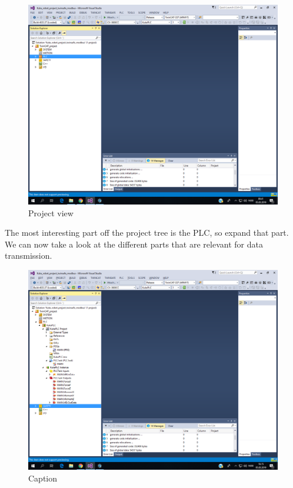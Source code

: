 \documentclass{article}
\begin{document}
\begin{figure}[!h]
    \centering
    \includegraphics[width=\textwidth]{pictures/TC3_overview/TC3_project_view.png}
    \caption{Project view}
    \label{fig:my_label2}
\end{figure}

The most interesting part off the project tree is the PLC, so expand that part. 
\newpage
We can now take a look at the different parts that are relevant for data transmission.

\begin{figure}[!h]
    \centering
    \includegraphics[width=\textwidth]{pictures/TC3_overview/TC3_PLC_expanded.png}
    \caption{Caption}
    \label{fig:my_label}
\end{figure}
\end{document}

